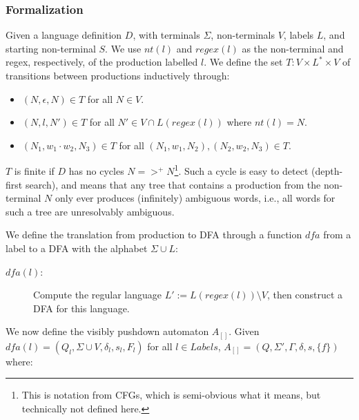 \documentclass[runningheads]{llncs}
\newcommand{\NT}{V} %
\newcommand{\T}{\Sigma} %
\newcommand{\Labels}{L} %
\newcommand{\pospl}{[}
\newcommand{\pospr}{]}
\newcommand{\posp}[1]{\pospl#1\pospr}
\newcommand{\dfa}{\mathit{dfa}} %
\newcommand{\labelnt}{\mathit{nt}} %
\newcommand{\labelregex}{\mathit{regex}} %
\begin{document}
\subsubsection{Formalization}

Given a language definition $D$, with terminals $\T$, non-terminals $\NT$, labels $\Labels$, and starting non-terminal $S$. We use $\labelnt(l)$ and $\labelregex(l)$ as the non-terminal and regex, respectively, of the production labelled $l$. We define the set $T : \NT \times \Labels^{*} \times \NT$ of transitions between productions inductively through:

\begin{itemize}
\item $(N, \epsilon, N) \in T$ for all $N \in \NT$.
\item $(N, l, N') \in T$ for all $N' \in \NT \cap L(\labelregex(l))$ where $\labelnt(l) = N$.
\item $(N_1, w_1 \cdot w_2, N_3) \in T$ for all $(N_1, w_1, N_2), (N_2, w_2, N_3) \in T$.
\end{itemize}

\noindent $T$ is finite if $D$ has no cycles $N =>^{+} N$\footnote{This is notation from CFGs, which is semi-obvious what it means, but technically not defined here.}. Such a cycle is easy to detect (depth-first search), and means that any tree that contains a production from the non-terminal $N$ only ever produces (infinitely) ambiguous words, i.e., all words for such a tree are unresolvably ambiguous.

We define the translation from production to DFA through a function $\dfa$ from a label to a DFA with the alphabet $\T \cup \Labels$:

\begin{description}
\item[$\dfa(l)$:] Compute the regular language $L' := L(\labelregex(l)) \setminus \NT$, then construct a DFA for this language.
\end{description}

\noindent We now define the visibly pushdown automaton $A_{\posp{}}$. Given $\dfa(l) = (Q_l, \T \cup \NT, \delta_l, s_l, F_l)$ for all $l \in Labels$, $A_{\posp{}} = (Q, \T', \Gamma, \delta, s, \{f\})$ where:
\end{document}
